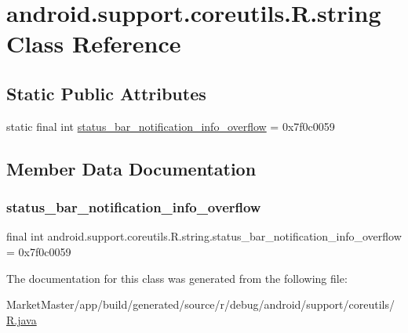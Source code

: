 \hypertarget{classandroid_1_1support_1_1coreutils_1_1R_1_1string}{}\section{android.\+support.\+coreutils.\+R.\+string Class Reference}
\label{classandroid_1_1support_1_1coreutils_1_1R_1_1string}
\subsection*{Static Public Attributes}
\begin{DoxyCompactItemize}
\item 
static final int \mbox{\hyperlink{classandroid_1_1support_1_1coreutils_1_1R_1_1string_ac3802014c312560d8974b22579aba880}{status\+\_\+bar\+\_\+notification\+\_\+info\+\_\+overflow}} = 0x7f0c0059
\end{DoxyCompactItemize}


\subsection{Member Data Documentation}
\mbox{\label{classandroid_1_1support_1_1coreutils_1_1R_1_1string_ac3802014c312560d8974b22579aba880}} 
\subsubsection{\texorpdfstring{status\+\_\+bar\+\_\+notification\+\_\+info\+\_\+overflow}{status\_bar\_notification\_info\_overflow}}
{\footnotesize\ttfamily final int android.\+support.\+coreutils.\+R.\+string.\+status\+\_\+bar\+\_\+notification\+\_\+info\+\_\+overflow = 0x7f0c0059\hspace{0.3cm}{\ttfamily [static]}}



The documentation for this class was generated from the following file\+:\begin{DoxyCompactItemize}
\item 
Market\+Master/app/build/generated/source/r/debug/android/support/coreutils/\mbox{\hyperlink{debug_2android_2support_2coreutils_2R_8java}{R.\+java}}\end{DoxyCompactItemize}
